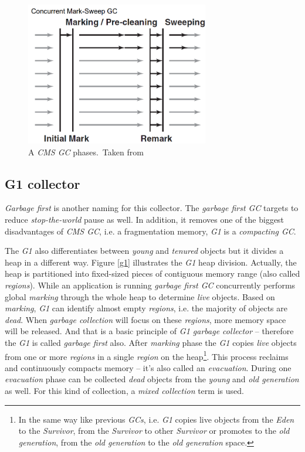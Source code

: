 \documentclass[
  digital, %
  oneside,
  notable, %
  nolof,     %
  nolot     %
]{fithesis3}
\begin{document}
\begin{figure}[h]
	\centering
	\includegraphics[width=8cm]{fig/cms.png}
	\caption{A \textit{CMS GC} phases.~Taken from \cite{hunt}}
	\label{cms}
\end{figure}

\subsection{G1 collector}
\textit{Garbage first} is another naming for this collector. The \textit{garbage first GC} targets to reduce \textit{stop-the-world} pause as well. In addition, it removes one of the biggest disadvantages of \textit{CMS GC}, i.e. a fragmentation memory, \textit{G1} is a \textit{compacting GC}. \cite{gctuning}

The \textit{G1} also differentiates between \textit{young} and \textit{tenured} objects but it divides a heap in a different way. Figure \ref{g1} illustrates the \textit{G1} heap division. Actually, the heap is partitioned into fixed-sized pieces of contiguous memory range (also called \textit{regions}). While an application is running \textit{garbage first GC} concurrently performs global \textit{marking} through the whole heap to determine \textit{live} objects. Based on \textit{marking}, \textit{G1} can identify almost empty \textit{regions}, i.e. the majority of objects are \textit{dead}. When \textit{garbage collection} will focus on these \textit{regions}, more memory space will be released. And that is a basic principle of \textit{G1 garbage collector} -- therefore the \textit{G1} is called \textit{garbage first} also. After \textit{marking} phase the \textit{G1} copies \textit{live} objects from one or more \textit{regions} in a single \textit{region} on the heap\footnote{In the same way like previous \textit{GCs}, i.e. \textit{G1} copies live objects from the \textit{Eden} to the \textit{Survivor}, from the \textit{Survivor} to other \textit{Survivor} or promotes to the \textit{old generation}, from the \textit{old generation} to the \textit{old generation} space.}. This process reclaims and continuously compacts memory -- it's also called an \textit{evacuation}. During one \textit{evacuation} phase can be collected \textit{dead} objects from the \textit{young} and \textit{old generation} as well. For this kind of collection, a \textit{mixed collection} term is used. \cite{gctuning}
\end{document}

